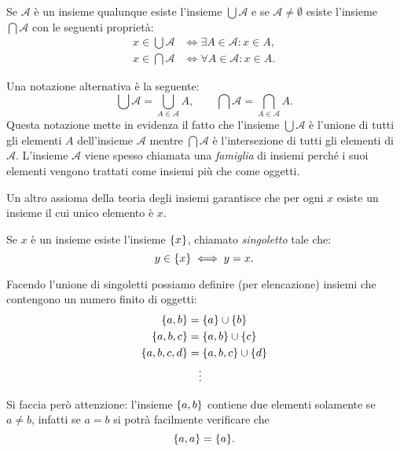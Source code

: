 \begin{axiom}
Se $\mathcal A$ è un insieme qualunque esiste l'insieme $\bigcup \mathcal A$
e se $\mathcal A \neq \emptyset$ esiste l'insieme $\bigcap \mathcal A$
con le seguenti proprietà:
\begin{align*}
  x \in \bigcup \mathcal A & \iff \exists A \in \mathcal A \colon x\in A, \\
  x \in \bigcap \mathcal A & \iff \forall A \in \mathcal A \colon x\in A.
\end{align*}
\end{axiom}
Una notazione alternativa è la seguente:
\[
 \bigcup \mathcal A = \bigcup_{A\in \mathcal A} A, \qquad 
 \bigcap \mathcal A = \bigcap_{A\in \mathcal A} A.  
\]
Questa notazione mette in evidenza il fatto che l'insieme 
$\bigcup \mathcal A$ è l'unione di tutti gli elementi $A$ dell'insieme 
$\mathcal A$ mentre $\bigcap \mathcal A$ è l'intersezione 
di tutti gli elementi di $\mathcal A$.
L'insieme $\mathcal A$ viene spesso chiamata una \emph{famiglia}
di insiemi perché i suoi elementi vengono trattati come insiemi 
più che come oggetti.

Un altro assioma della teoria degli insiemi garantisce che per ogni
$x$ esiste un insieme il cui unico elemento è $x$. 
\begin{axiom}[singoletto]
  Se $x$ è un insieme esiste l'insieme ${\left\{ x \right\}}$, 
  chiamato \emph{singoletto}%
%
  tale che:
  \[
    y \in {\left\{ x \right\}} \iff y=x.
  \]
\end{axiom}
Facendo l'unione di singoletti possiamo definire (per elencazione) insiemi che contengono
un numero finito di oggetti:
\begin{align*}
  {\left\{ a,b \right\}} &= {\left\{ a \right\}} \cup {\left\{ b \right\}} \\
  {\left\{ a, b, c \right\}} &= {\left\{ a,b \right\}} \cup {\left\{ c \right\}}\\
  {\left\{ a, b, c, d \right\}} &= {\left\{ a,b,c \right\}} \cup {\left\{ d \right\}}\\
  &\quad\vdots
\end{align*}

Si faccia però attenzione: l'insieme ${\left\{ a,b \right\}}$ contiene due elementi
solamente se $a\neq b$, infatti se $a=b$ si potrà facilmente verificare
che
\begin{equation}\label{eq:4775523}
{\left\{ a,a \right\}} = {\left\{ a \right\}}.
\end{equation}

